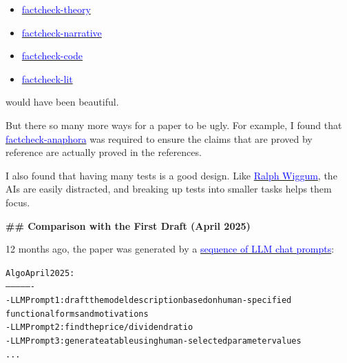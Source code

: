 \documentclass[12pt]{article}
\begin{document}
\begin{mdframed}[
linewidth=1pt,
linecolor=black,
innerleftmargin=0.25em,
innerrightmargin=0.25em,
innertopmargin=0.2\baselineskip,
innerbottommargin=0.8\baselineskip
]
\vspace{-2ex}
\begin{itemize}
\setlength{\itemsep}{0.15em}
\setlength{\parskip}{0pt}
\item \href{https://github.com/redacted/ralph-wiggum-asset-pricing/blob/main/tests/factcheck-theory.py}{\textcolor{blue}{factcheck-theory}}
\item \href{https://github.com/redacted/ralph-wiggum-asset-pricing/blob/main/tests/factcheck-narrative.py}{\textcolor{blue}{factcheck-narrative}}
\item \href{https://github.com/redacted/ralph-wiggum-asset-pricing/blob/main/tests/factcheck-code.py}{\textcolor{blue}{factcheck-code}}
\item \href{https://github.com/redacted/ralph-wiggum-asset-pricing/blob/main/tests/factcheck-lit.py}{\textcolor{blue}{factcheck-lit}}
\end{itemize}
\vspace{-2ex}

would have been beautiful.

But there so many more ways for a paper to be ugly. For example, I found that \href{https://github.com/redacted/ralph-wiggum-asset-pricing/blob/main/tests/factcheck-anaphora.py}{\textcolor{blue}{factcheck-anaphora}} was required to ensure the claims that are proved by reference are actually proved in the references.

I also found that having many tests is a good design. Like \href{https://en.wikipedia.org/wiki/Ralph_Wiggum}{\textcolor{blue}{Ralph Wiggum}}, the AIs are easily distracted, and breaking up tests into smaller tasks helps them focus.

\par
{\large\bfseries \textcolor{red!70!black}{\#\# Comparison with the First Draft (April 2025)}}
\par

12 months ago, the paper was generated by a \href{https://github.com/redacted/Prompts-to-Paper/}{\textcolor{blue}{sequence of LLM chat prompts}}:

\begin{mdframed}[backgroundcolor=gray!10,linewidth=0.6pt,linecolor=gray!70,roundcorner=2pt,innerleftmargin=0.6em,innerrightmargin=0.6em,innertopmargin=0.5\baselineskip,innerbottommargin=0.5\baselineskip]
\begingroup
\small
\setlength{\parindent}{0pt}
\setlength{\parskip}{0pt}
\begin{alltt}

Algo April 2025:
----------------
- LLM Prompt  1: draft the model description based on human-specified 
                 functional forms and motivations
- LLM Prompt  2: find the price/dividend ratio
- LLM Prompt  3: generate a table using human-selected parameter values 
...             
\end{alltt}
\endgroup
\end{mdframed}


\end{mdframed}
\end{document}
